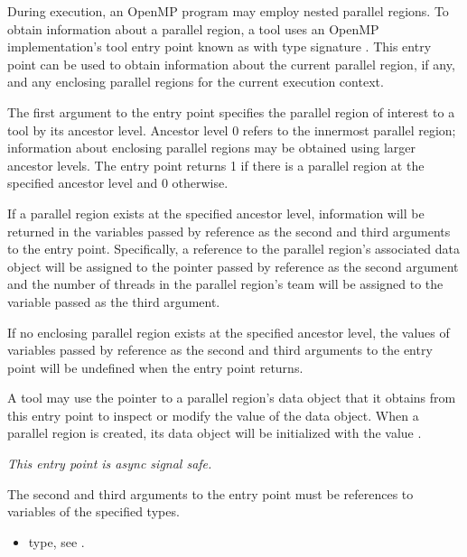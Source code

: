 \descr
During execution, an OpenMP program may employ nested parallel
regions. 
To obtain information about a parallel region, 
a tool uses an OpenMP implementation's tool entry point known as
with type signature . 
This entry point
can be used to obtain information about the current parallel region,
if any, and any enclosing parallel regions
for the current execution context.

The first argument to the entry point specifies the parallel region of
interest to a tool by its ancestor level.
Ancestor level 0 refers to the innermost parallel region; information
about enclosing parallel regions may be obtained using larger
ancestor levels.  The  entry point
returns 1 if there is a parallel region at the
specified ancestor level and 0 otherwise. 

If a parallel region exists at the specified ancestor
level, information will be returned in the variables passed by
reference as the second and third arguments to the entry point. 
Specifically, a reference to the parallel region's associated 
data object will be assigned to the pointer passed by reference 
as the second argument and the number of 
threads in the parallel region's team 
will be assigned to the variable passed as the third
argument.

If no enclosing parallel region exists at the specified ancestor
level, the values of variables passed by reference as the second
and third arguments to the entry point will be undefined when the
entry point returns.

A tool may use the pointer to a parallel region's data object that it
obtains from this entry point to inspect or modify the value of the
data object.
When a parallel region is created, its data object will be initialized
with the value .  

{\em This entry point is async signal safe.}

\constraints
The second and third arguments to the entry point must be references
to variables of the specified types.

\crossreferences
\begin{itemize}
\item {} type, see .
\end{itemize}

\subsubsection{}
\label{sec:ompt_get_task_info_t}
\label{sec:ompt_get_task_info}

